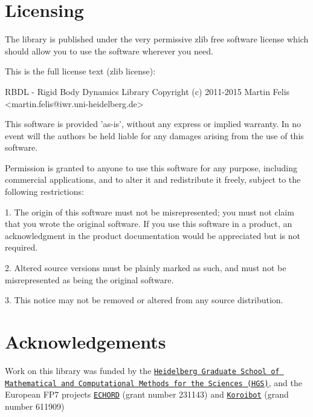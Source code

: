 \section*{Licensing }

The library is published under the very permissive zlib free software license which should allow you to use the software wherever you need.

This is the full license text (zlib license)\+: \begin{DoxyVerb}RBDL - Rigid Body Dynamics Library
Copyright (c) 2011-2015 Martin Felis <martin.felis@iwr.uni-heidelberg.de>

This software is provided 'as-is', without any express or implied
warranty. In no event will the authors be held liable for any damages
arising from the use of this software.

Permission is granted to anyone to use this software for any purpose,
including commercial applications, and to alter it and redistribute it
freely, subject to the following restrictions:

   1. The origin of this software must not be misrepresented; you must not
   claim that you wrote the original software. If you use this software
   in a product, an acknowledgment in the product documentation would be
   appreciated but is not required.

   2. Altered source versions must be plainly marked as such, and must not
   be misrepresented as being the original software.

   3. This notice may not be removed or altered from any source
   distribution.
\end{DoxyVerb}


\section*{Acknowledgements }

Work on this library was funded by the \href{http://hgs.iwr.uni-heidelberg.de/hgs.mathcomp/}{\tt Heidelberg Graduate School of Mathematical and Computational Methods for the Sciences (H\+G\+S)}, and the European F\+P7 projects \href{http://echord.eu}{\tt E\+C\+H\+O\+R\+D} (grant number 231143) and \href{http://koroibot.eu}{\tt Koroibot} (grand number 611909) 